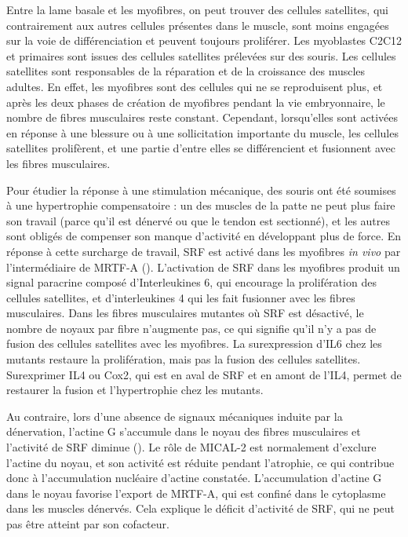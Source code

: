 Entre la lame basale et les myofibres, on peut trouver des cellules satellites, qui contrairement aux autres cellules présentes dans le muscle, sont moins engagées sur la voie de différenciation et peuvent toujours proliférer. Les myoblastes C2C12 et primaires sont issues des cellules satellites prélevées sur des souris. Les cellules satellites sont responsables de la réparation et de la croissance des muscles adultes. 
En effet, les myofibres sont des cellules qui ne se reproduisent plus, et après les deux phases de création de myofibres pendant la vie embryonnaire, le nombre de fibres musculaires reste constant. 
Cependant, lorsqu'elles sont activées en réponse à une blessure ou à une sollicitation importante du muscle, les cellules satellites prolifèrent, et une partie d'entre elles se différencient et fusionnent avec les fibres musculaires. 

Pour étudier la réponse à une stimulation mécanique, des souris ont été soumises à une hypertrophie compensatoire : un des muscles de la patte ne peut plus faire son travail (parce qu’il est dénervé ou que le tendon est sectionné), et les autres sont obligés de compenser son manque d'activité en développant plus de force. En réponse à cette surcharge de travail, SRF est activé dans les myofibres \textit{in vivo} par l'intermédiaire de MRTF-A  (\cite{guerci_srf-dependent_2012}). 
L'activation de SRF dans les myofibres produit un signal paracrine composé d'Interleukines 6, qui encourage la prolifération des cellules satellites, et d'interleukines 4 qui les fait fusionner avec les fibres musculaires. 
Dans les fibres musculaires mutantes où SRF est désactivé, le nombre de noyaux par fibre n'augmente pas, ce qui signifie qu'il n'y a pas de fusion des cellules satellites avec les myofibres. La surexpression d'IL6 chez les mutants restaure la prolifération, mais pas la fusion des cellules satellites. Surexprimer IL4 ou Cox2, qui est en aval de SRF et en amont de l'IL4, permet de restaurer la fusion et l'hypertrophie chez les mutants. 


Au contraire, lors d'une absence de signaux mécaniques induite par la dénervation, l'actine G s'accumule dans le noyau des fibres musculaires et l'activité de SRF diminue (\cite{collard_nuclear_2014}). Le rôle de MICAL-2 est normalement d'exclure l'actine du noyau, et son activité est réduite pendant l'atrophie, ce qui contribue donc à l'accumulation nucléaire d'actine constatée. 
L'accumulation d'actine G dans le noyau favorise l'export de MRTF-A, qui est confiné dans le cytoplasme dans les muscles dénervés. Cela explique le déficit d'activité de SRF, qui ne peut pas être atteint par son cofacteur. 

